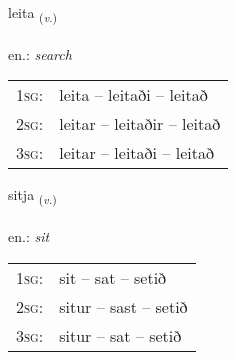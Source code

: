 \documentclass[frontgrid, backgrid]{flacards}\usepackage[]{graphicx}\usepackage[]{xcolor}
\begin{document}
\renewcommand{\flhead}{\vskip5pt \fboxsep=0pt {\small\bfseries\footnotesize Sagnorð | Verb}}
\renewcommand{\fcfoot}{\vskip5pt \fboxsep=0pt \hspace{2pt}{\small\bfseries\footnotesize 1K}}

\renewcommand{\blhead}{\vskip5pt {\small\bfseries\footnotesize Sagnorð | Verb }}
\renewcommand{\bcfoot}{\vskip5pt \hspace{2pt}{\small\bfseries\footnotesize 1K}}


{leita \small{\textsubscript{(\textit{v.})}} \\[1ex] %
\textphonetic{[leiːta]} \\
en.: \emph{search} \\  [2ex]
\renewcommand*{\arraystretch}{0.8}
\begin{tabular}{p{1cm}l}
\textsc{1sg}: & leita -- leitaði -- leitað \\ 
\textsc{2sg}: & leitar -- leitaðir -- leitað \\ 
\textsc{3sg}: & leitar -- leitaði -- leitað \\ 
\end{tabular}
}

\renewcommand{\flhead}{\vskip5pt \fboxsep=0pt {\small\bfseries\footnotesize Sagnorð | Verb}}
\renewcommand{\fcfoot}{\vskip5pt \fboxsep=0pt \hspace{2pt}{\small\bfseries\footnotesize 1K}}

\renewcommand{\blhead}{\vskip5pt {\small\bfseries\footnotesize Sagnorð | Verb }}
\renewcommand{\bcfoot}{\vskip5pt \hspace{2pt}{\small\bfseries\footnotesize 1K}}


{sitja \small{\textsubscript{(\textit{v.})}} \\[1ex] %
\textphonetic{[sɪːtja]} \\
en.: \emph{sit} \\  [2ex]
\renewcommand*{\arraystretch}{0.8}
\begin{tabular}{p{1cm}l}
\textsc{1sg}: & sit -- sat -- setið \\ 
\textsc{2sg}: & situr -- sast -- setið \\ 
\textsc{3sg}: & situr -- sat -- setið \\ 
\end{tabular}
}
\end{document}
